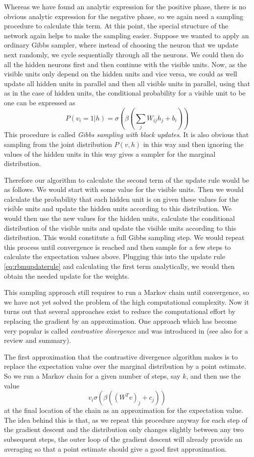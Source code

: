\documentclass[a4paper, draft]{article}
\theoremstyle{own}
\theoremstyle{remark}
\begin{document}
Whereas we have found an analytic expression for the positive phase, there is no obvious analytic expression for the negative phase, so we again need a sampling procedure to calculate this term. At this point, the special structure of the network again helps to make the sampling easier. Suppose we wanted to apply an ordinary Gibbs sampler, where instead of choosing the neuron that we update next randomly, we cycle sequentially through all the neurons. We could then do all the hidden neurons first and then continue with the visible units. Now, as the visible units only depend on the hidden units and vice versa, we could as well update all hidden units in parallel and then all visible units in parallel, using that as in the case of hidden units, the conditional probability for a visible unit to be one can be expressed as
$$
P(v_i = 1 | h) = \sigma(\beta (\sum_j W_{ij} h_j + b_i))
$$ 
This procedure is called {\em Gibbs sampling with block updates}. It is also obvious that sampling from the joint distribution $P(v,h)$ in this way and then ignoring the values of the hidden units in this way gives a sampler for the marginal distribution. 

Therefore our algorithm to calculate the second term of the update rule would be as follows. We would start with some value for the visible units. Then we would calculate the probability that each hidden unit is on given these values for the visible units and update the hidden units according to this distribution. We would then use the new values for the hidden units, calculate the conditional distribution of the visible units and update the visible units according to this distribution. This would constitute a full Gibbs sampling step. We would repeat this process until convergence is reached and then sample for a few steps to calculate the expectation values above. Plugging this into the update rule \eqref{eq:rbmupdaterule} and calculating the first term analytically, we would then obtain the needed update for the weights.

This sampling approach still requires to run a Markov chain until convergence, so we have not yet solved the problem of the high computational complexity. Now it turns out that several approaches exist to reduce the computational effort by replacing the gradient by an approximation. One approach which has become very popular is called {\em contrastive divergence} and was introduced in \cite{Hinton2002} (see also \cite{FischerIgel2014} for a review and summary). 

The first approximation that the contrastive divergence algorithm makes is to replace the expectation value over the marginal distribution by a point estimate. So we run a Markov chain for a given number of steps, say $k$, and then use the value
$$
v_i \sigma(\beta ((W^T v)_j + c_j))
$$
at the final location of the chain as an approximation for the expectation value. The idea behind this is that, as we repeat this procedure anyway for each step of the gradient descent and the distribution only changes slightly between any two subsequent steps, the outer loop of the gradient descent will already provide an averaging so that a point estimate should give a good first approximation.
\end{document}
